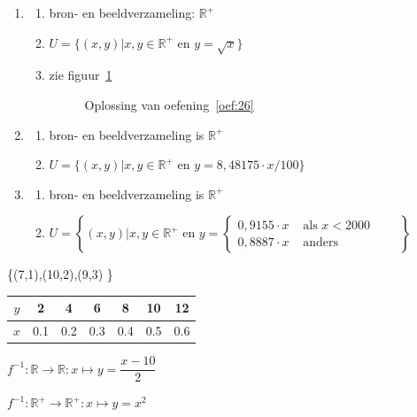 \begin{Oplossing}{2.6}
\begin{enumerate}
\item
\begin{enumerate}
\item bron- en beeldverzameling: $\mathbb{R}^+$
\item $U=\{(x,y)|x,y\in \mathbb{R}^+\text{ en } y=\sqrt{x} \}$
\item zie figuur~\ref{oef:opl26}
\begin{figure}[htbp]
\centering
{}
\caption{Oplossing van oefening~\ref{oef:26} }
\label{oef:opl26}
\end{figure}
\end{enumerate}


\item
\begin{enumerate}
\item bron- en beeldverzameling is  $\mathbb{R}^+$
\item $U=\{(x,y)|x,y\in \mathbb{R}^+\text{ en } y=8,48175\cdot x/100\}$
\end{enumerate}
\item
\begin{enumerate}
\item bron- en beeldverzameling is  $\mathbb{R}^+$
\item $U=\left\lbrace(x,y)|x,y\in \mathbb{R}^+\text{ en } y=
\begin{cases}
0,9155\cdot x&\text{ als }x<2000\\
0,8887\cdot x&\text{ anders }
\end{cases} \qquad
\right\rbrace$
\end{enumerate}

\end{enumerate}
\end{Oplossing}
\begin{Oplossing}{2.7}
\item \{(7,1),(10,2),(9,3) \}
\item
\begin{tabular}{c|cccccc}
$y$ & 2 & 4 & 6 & 8 & 10 & 12 \\
\midrule
$x$ & \num{0.1} & \num{0.2} & \num{0.3} & \num{0.4} & \num{0.5} & \num{0.6} \\
\end{tabular}
\item $f^{-1}: \mathbb{R}\rightarrow\mathbb{R}:x\mapsto  y=\dfrac{x-10}{2} $
\item $f^{-1}: \mathbb{R}^+\rightarrow\mathbb{R}^+:x\mapsto y=x^2$
\end{Oplossing}
